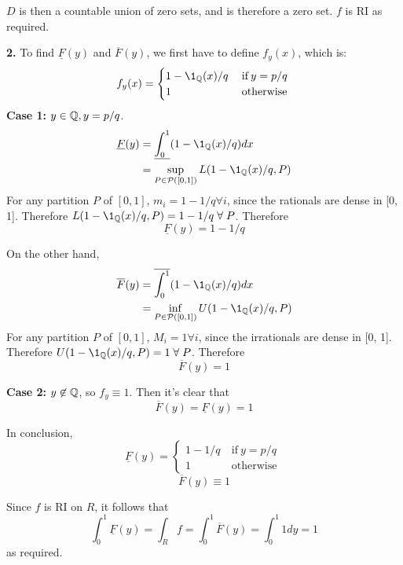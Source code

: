 \documentclass[a4paper, 12pt]{article}
\begin{document}
\begin{solution}
    $D$ is then a countable union of zero sets, and is therefore a zero set. $f$ is RI as required.

    \textbf{2.} To find $\underline{F}(y)$ and $\overline{F}(y)$, we first have to define $f_y(x)$, which is:
    \[
        f_y(x) = \begin{cases}
            1 - \1_\bbq(x)/q & \:\text{if}\: y = p/q \\
            1                & \:\text{otherwise}\:
        \end{cases}
    \]
    \textbf{Case 1:} $y \in \mathbb{Q}, y = p/q$.
    \begin{align*}
        \underline{F}(y) & = \underline{\int_{0}^{1}} ( 1 - \1_\bbq(x)/q) dx           \\
                         & = \sup_{P \in \mathcal{P}([0, 1])} L ( 1 - \1_\bbq(x)/q, P)
    \end{align*}
    For any partition $P$ of $[0, 1]$, $m_i = 1- 1/q \forall i$, since the rationals are dense in [0, 1]. Therefore $L( 1 - \1_\bbq(x)/q, P) = 1-1/q \forall P$. Therefore \[
        \underline{F}(y) = 1 - 1/q
    \]

    On the other hand, \begin{align*}
        \overline{F}(y) & = \overline{\int_{0}^{1}} ( 1 - \1_\bbq(x)/q) dx            \\
                        & = \inf_{P \in \mathcal{P}([0, 1])} U ( 1 - \1_\bbq(x)/q, P)
    \end{align*}
    For any partition $P$ of $[0, 1]$, $M_i = 1 \forall i$, since the irrationals are dense in [0, 1]. Therefore $U( 1 - \1_\bbq(x)/q, P) = 1 \forall P$. Therefore \[
        \overline{F}(y) = 1
    \]

    \textbf{Case 2:} $y \not \in \mathbb{Q}$, so $f_y \equiv 1$. Then it's clear that
    \[
        \overline{F}(y) = \underline{F}(y) = 1
    \]

    In conclusion,
    \[
        \underline{F}(y) = \begin{cases}
            1 - 1/q & \:\text{if}\:  y = p/q \\
            1       & \:\text{otherwise}\:
        \end{cases}
    \]\[
        \overline{F}(y) \equiv 1
    \]

    Since $f$ is RI on $R$, it follows that \[
        \int_{0}^1 \underline{F}(y) = \int_{R} f = \int_{0}^{1} \overline{F}(y) = \int_{0}^1 1 dy = 1
    \]
    as required.
\end{solution}
\end{document}
